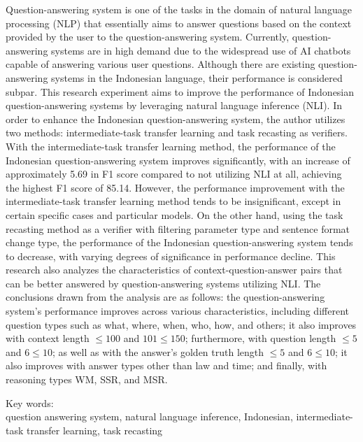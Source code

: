 \noindent Question-answering system is one of the tasks in the domain of natural language processing (NLP) that essentially aims to answer questions based on the context provided by the user to the question-answering system. Currently, question-answering systems are in high demand due to the widespread use of AI chatbots capable of answering various user questions. Although there are existing question-answering systems in the Indonesian language, their performance is considered subpar. This research experiment aims to improve the performance of Indonesian question-answering systems by leveraging natural language inference (NLI). In order to enhance the Indonesian question-answering system, the author utilizes two methods: intermediate-task transfer learning and task recasting as verifiers. With the intermediate-task transfer learning method, the performance of the Indonesian question-answering system improves significantly, with an increase of approximately 5.69 in F1 score compared to not utilizing NLI at all, achieving the highest F1 score of 85.14. However, the performance improvement with the intermediate-task transfer learning method tends to be insignificant, except in certain specific cases and particular models. On the other hand, using the task recasting method as a verifier with filtering parameter type and sentence format change type, the performance of the Indonesian question-answering system tends to decrease, with varying degrees of significance in performance decline. This research also analyzes the characteristics of context-question-answer pairs that can be better answered by question-answering systems utilizing NLI. The conclusions drawn from the analysis are as follows: the question-answering system's performance improves across various characteristics, including different question types such as what, where, when, who, how, and others; it also improves with context length $\leq100$ and $101\leq150$; furthermore, with question length $\leq5$ and $6\leq10$; as well as with the answer's golden truth length $\leq5$ and $6\leq10$; it also improves with answer types other than law and time; and finally, with reasoning types WM, SSR, and MSR.

\vspace*{0.2cm}

\noindent Key words: \\ question answering system, natural language inference, Indonesian, intermediate-task transfer learning, task recasting \\

\newpage
